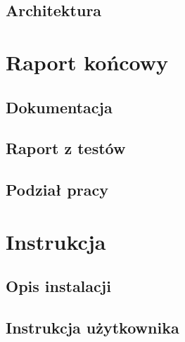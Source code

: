 	\section{Architektura}\label{sec:architektura-zmiany}
	

	\chapter{Raport końcowy}\label{chap:raport końcowy}
	\section{Dokumentacja}\label{sec:dokumentacja}
	
	\section{Raport z testów}\label{sec:raport z testów}
	
	\section{Podział pracy}\label{sec:podzial}
	
	

	\chapter{Instrukcja}\label{chap:instrukcja}
	\section{Opis instalacji}\label{sec:instrukcja użytkownika}
	
	\section{Instrukcja użytkownika}\label{sec:instrukcja użytkownika}
	

	

	\newpage
	
	\newpage



